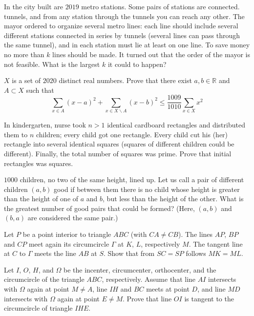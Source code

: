\documentclass[11pt]{scrartcl}
\begin{document}
\begin{problem}[175452544956824]
In the city built are $2019$ metro stations. Some pairs of stations are connected. tunnels, and from any station through the tunnels you can reach any other. The mayor ordered to organize several metro lines: each line should include several different stations connected in series by tunnels (several lines can pass through the same tunnel), and in each station must lie at least on one line. To save money no more than $k$ lines should be made. It turned out that the order of the mayor is not feasible. What is the largest $k$ it could to happen?
\end{problem}
\begin{problem}[176031103945886]
	$X$ is a set of $2020$ distinct real numbers. Prove that there exist $a,b\in \mathbb{R}$ and $A\subset X$ such that
$$\sum_{x\in A}(x-a)^2 +\sum_{x\in X\backslash A}(x-b)^2\le \frac{1009}{1010}\sum_{x\in X}x^2$$
\end{problem}
\begin{problem}[181463134716189]
	In kindergarten, nurse took $n>1$ identical cardboard rectangles and distributed them to $n$ children; every child got one rectangle. Every child cut his (her) rectangle into several identical squares (squares of different children could be different). Finally, the total number of squares was prime. Prove that initial rectangles was squares.
\end{problem}
\begin{problem}[181878217485192]
$1000$ children, no two of the same height, lined up. Let us call a pair of different children $(a,b)$ good if between them there is no child whose height is greater than the height of one of $a$ and $b$, but less than the height of the other. What is the greatest number of good pairs that could be formed? (Here, $(a,b)$ and $(b,a)$ are considered the same pair.)
\end{problem}
\begin{problem}[182831966962001]
Let $P$ be a point interior to triangle $ABC$ (with $CA \neq CB$). The lines $AP$, $BP$ and $CP$ meet again its circumcircle $\Gamma$ at $K$, $L$, respectively $M$. The tangent line at $C$ to $\Gamma$ meets the line $AB$ at $S$. Show that from $SC = SP$ follows $MK = ML$.
\end{problem}
\begin{problem}[183354438240037]
Let $I$, $O$, $H$, and $\Omega$ be the incenter, circumcenter, orthocenter, and the circumcircle of the triangle $ABC$, respectively. Assume that line $AI$ intersects with $\Omega$ again at point $M\neq A$, line $IH$ and $BC$ meets at point $D$, and line $MD$ intersects with $\Omega$ again at point $E\neq M$. Prove that line $OI$ is tangent to the circumcircle of triangle $IHE$.
\end{problem}
\end{document}
